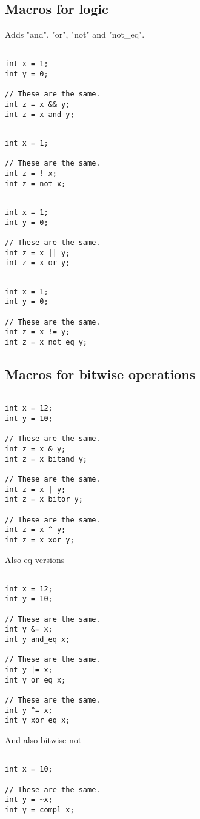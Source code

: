 
\subsection{Macros for logic}

Adds "and", "or", "not" and "not\_eq".

\begin{verbatim}

int x = 1;
int y = 0;

// These are the same.
int z = x && y;
int z = x and y;

\end{verbatim}

\begin{verbatim}

int x = 1;

// These are the same.
int z = ! x;
int z = not x;

\end{verbatim}

\begin{verbatim}

int x = 1;
int y = 0;

// These are the same.
int z = x || y;
int z = x or y;

\end{verbatim}

\begin{verbatim}

int x = 1;
int y = 0;

// These are the same.
int z = x != y;
int z = x not_eq y;

\end{verbatim}

\subsection{Macros for bitwise operations}

\begin{verbatim}

int x = 12;
int y = 10;

// These are the same.
int z = x & y;
int z = x bitand y;

// These are the same.
int z = x | y;
int z = x bitor y;

// These are the same.
int z = x ^ y;
int z = x xor y;

\end{verbatim}

Also eq versions

\begin{verbatim}

int x = 12;
int y = 10;

// These are the same.
int y &= x;
int y and_eq x;

// These are the same.
int y |= x;
int y or_eq x;

// These are the same.
int y ^= x;
int y xor_eq x;

\end{verbatim}

And also bitwise not

\begin{verbatim}

int x = 10;

// These are the same.
int y = ~x;
int y = compl x;

\end{verbatim}

